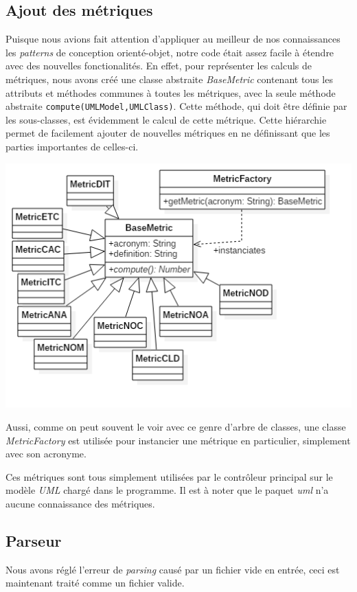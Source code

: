 \documentclass[letter,french]{report}
\begin{document}
	\subsection*{Ajout des métriques}
  Puisque nous avions fait attention d'appliquer au meilleur de nos
  connaissances les \emph{patterns} de conception orienté-objet, notre code
  était assez facile à étendre avec des nouvelles fonctionalités. En effet, pour
  représenter les calculs de métriques, nous avons créé une classe abstraite
  \emph{BaseMetric} contenant tous les attributs et méthodes communes à toutes
  les métriques, avec la seule méthode abstraite
  \texttt{compute(UMLModel,UMLClass)}. Cette méthode, qui doit être définie par
  les sous-classes, est évidemment le calcul de cette métrique.
  Cette hiérarchie permet de facilement ajouter de nouvelles métriques en ne
  définissant que les parties importantes de celles-ci.

	\includegraphics[scale=.5]{images/Metrics_diagram.png}

  Aussi, comme on peut souvent le voir avec ce genre d'arbre de classes, une
  classe \emph{MetricFactory} est utilisée pour instancier une métrique en
  particulier, simplement avec son acronyme.

  Ces métriques sont tous simplement utilisées par le contrôleur principal
  sur le modèle \emph{UML} chargé dans le programme. Il est à noter que le
  paquet \emph{uml} n'a aucune connaissance des métriques.
	
	\subsection*{Parseur}
  Nous avons réglé l'erreur de \emph{parsing} causé par un fichier vide en
  entrée, ceci est maintenant traité comme un fichier valide.
\end{document}
